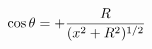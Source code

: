 \documentclass[preview]{standalone}
\begin{document}
\begin{align*}
\cos \theta = + {R \over (x^2 + R^2)^{1/2}}
\end{align*}
\end{document}
